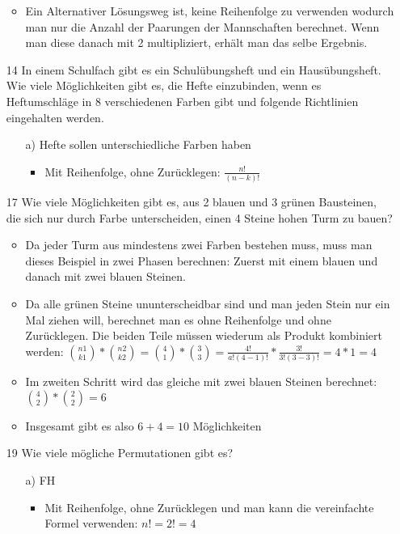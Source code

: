 \documentclass{article}
\begin{document}
\begin{itemize}
\begin{itemize}
			\item{Ein Alternativer Lösungsweg ist, keine Reihenfolge zu verwenden wodurch man nur die Anzahl der Paarungen der Mannschaften berechnet. Wenn man diese danach mit 2 multipliziert, erhält man das selbe Ergebnis.}
		\end{itemize}
		\item[14]{In einem Schulfach gibt es ein Schulübungsheft und ein Hausübungsheft. Wie viele Möglichkeiten gibt es, die Hefte einzubinden, wenn es Heftumschläge in 8 verschiedenen Farben gibt und folgende Richtlinien eingehalten werden.}
		\begin{itemize}
			\item[a)]{Hefte sollen unterschiedliche Farben haben}
			\begin{itemize}
				\item{Mit Reihenfolge, ohne Zurücklegen: $\frac{n!}{(n-k)!}$}
			\end{itemize}
		\end{itemize}
		\item[17]{Wie viele Möglichkeiten gibt es, aus 2 blauen und 3 grünen Bausteinen, die sich nur durch Farbe unterscheiden, einen 4 Steine hohen Turm zu bauen?}
		\begin{itemize}
			\item{Da jeder Turm aus mindestens zwei Farben bestehen muss, muss man dieses Beispiel in zwei Phasen berechnen: Zuerst mit einem blauen und danach mit zwei blauen Steinen.}
			\item{Da alle grünen Steine ununterscheidbar sind und man jeden Stein nur ein Mal ziehen will, berechnet man es ohne Reihenfolge und ohne Zurücklegen. Die beiden Teile müssen wiederum als Produkt kombiniert werden: $\binom{n1}{k1}*\binom{n2}{k2}=\binom{4}{1}*\binom{3}{3}=\frac{4!}{a!(4-1)!}*\frac{3!}{3!(3-3)!}=4*1=4$}
			\item{Im zweiten Schritt wird das gleiche mit zwei blauen Steinen berechnet: $\binom{4}{2}*\binom{2}{2}=6$}
			\item{Insgesamt gibt es also $6+4=10$ Möglichkeiten}
		\end{itemize}
		\item[19]{Wie viele mögliche Permutationen gibt es?}
		\begin{itemize}
			\item[a)]{FH}
			\begin{itemize}
				\item{Mit Reihenfolge, ohne Zurücklegen und man kann die vereinfachte Formel verwenden: $n!=2!=4$}
			\end{itemize}

\end{itemize}
\end{itemize}
\end{document}
